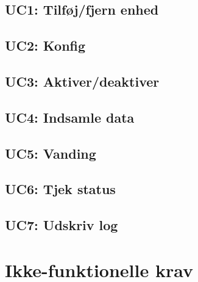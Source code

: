 %


\subsection{UC1: Tilføj/fjern enhed}



\subsection{UC2: Konfig}



\subsection{UC3: Aktiver/deaktiver}



\subsection{UC4: Indsamle data}



\subsection{UC5: Vanding}




\subsection{UC6: Tjek status}



\subsection{UC7: Udskriv log}



\section{Ikke-funktionelle krav}

